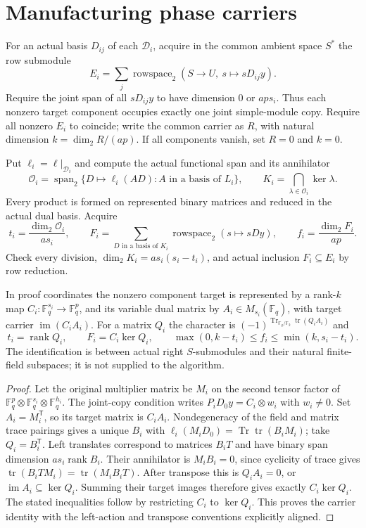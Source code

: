 \documentclass[11pt]{article}
\newcommand{\F}{\mathbb F}\newcommand{\rank}{\operatorname{rank}}
\newcommand{\im}{\operatorname{im}}\newcommand{\Tr}{\operatorname{Tr}}
\begin{document}
\section{Manufacturing phase carriers}
For an actual basis $D_{ij}$ of each $\mathcal D_i$, acquire in the common
ambient space $S^*$ the row submodule
\[
 E_i=\sum_j\operatorname{rowspace}_2(S\to U,\ s\mapsto sD_{ij}y).
\]
Require the joint span of all $sD_{ij}y$ to have dimension $0$ or
$ap s_i$. Thus each nonzero target component occupies exactly one joint
simple-module copy. Require all nonzero $E_i$ to coincide; write the
common carrier as $R$, with natural dimension $k=\dim_2R/(ap)$.
If all components vanish, set $R=0$ and $k=0$.

Put $\ell_i=\ell|_{\mathcal D_i}$ and compute the actual functional span
and its annihilator
\[
 \mathcal O_i=\operatorname{span}_2\{D\mapsto\ell_i(AD):
                  A\text{ in a basis of }L_i\},\qquad
 K_i=\bigcap_{\lambda\in\mathcal O_i}\ker\lambda.
\]
Every product is formed on represented binary matrices and reduced in the
actual dual basis. Acquire
\[
 t_i=\frac{\dim_2\mathcal O_i}{as_i},\qquad
 F_i=\sum_{D\text{ in a basis of }K_i}
          \operatorname{rowspace}_2(s\mapsto sDy),\qquad
 f_i=\frac{\dim_2F_i}{ap}.
\]
Check every division, $\dim_2K_i=as_i(s_i-t_i)$, and actual inclusion
$F_i\subseteq E_i$ by row reduction.

\begin{lemma}\label{lem:phase}
In proof coordinates the nonzero component target is represented by a
rank-$k$ map $C_i:\F_q^{s_i}\to\F_q^p$, and its variable dual matrix
by $A_i\in M_{s_i}(\F_q)$, with target carrier $\im(C_iA_i)$.
For a matrix $Q_i$ the character is
$(-1)^{\Tr_{\F_q/\F_2}\operatorname{tr}(Q_iA_i)}$ and
\[
 t_i=\rank Q_i,\qquad F_i=C_i\ker Q_i,\qquad
 \max(0,k-t_i)\le f_i\le\min(k,s_i-t_i).
\]
The identification is between actual right $S$-submodules and their natural
finite-field subspaces; it is not supplied to the algorithm.
\end{lemma}
\begin{proof}
Let the original multiplier matrix be $M_i$ on the second tensor factor of
$\F_q^p\otimes\F_q^{s_i}\otimes\F_q^{h_i}$. The joint-copy condition
writes $P_iD_0y=C_i\otimes w_i$ with $w_i\ne0$. Set
$A_i=M_i^{\mathsf T}$, so its target matrix is $C_iA_i$.
Nondegeneracy of the field and matrix trace pairings gives a unique $B_i$
with $\ell_i(M_iD_0)=\Tr\operatorname{tr}(B_iM_i)$; take
$Q_i=B_i^{\mathsf T}$. Left translates correspond to matrices $B_iT$
and have binary span dimension $as_i\rank B_i$. Their annihilator is
$M_iB_i=0$, since cyclicity of trace gives
$\operatorname{tr}(B_iT M_i)=\operatorname{tr}(M_iB_iT)$.
After transpose this is $Q_iA_i=0$, or $\im A_i\subseteq\ker Q_i$.
Summing their target images therefore gives exactly $C_i\ker Q_i$.
The stated inequalities follow by restricting $C_i$ to $\ker Q_i$.
This proves the carrier identity with the left-action and transpose
conventions explicitly aligned.
\end{proof}
\end{document}
